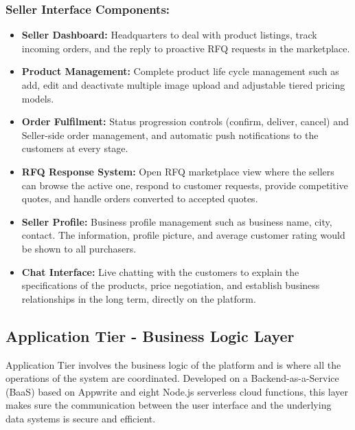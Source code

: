 \subsubsection{Seller Interface Components:}
\begin{itemize}
   \item \textbf{Seller Dashboard:} Headquarters to deal with product listings, track incoming orders, and the reply to proactive RFQ requests in the marketplace.
   \item \textbf{Product Management:} Complete product life cycle management such as add, edit and deactivate multiple image upload and adjustable tiered pricing models.
   \item \textbf{Order Fulfilment:} Status progression controls (confirm, deliver, cancel) and Seller-side order management, and automatic push notifications to the customers at every stage.
   \item \textbf{RFQ Response System:} Open RFQ marketplace view where the sellers can browse the active one, respond to customer requests, provide competitive quotes, and handle orders converted to accepted quotes.
   \item \textbf{Seller Profile:} Business profile management such as business name, city, contact. The information, profile picture, and average customer rating would be shown to all purchasers.
   \item \textbf{Chat Interface:} Live chatting with the customers to explain the specifications of the products, price negotiation, and establish business relationships in the long term, directly on the platform.
    
\end{itemize}

\subsection{Application Tier - Business Logic Layer}
Application Tier involves the business logic of the platform and is where all the operations of the system are coordinated. Developed on a Backend-as-a-Service (BaaS) based on Appwrite and eight Node.js serverless cloud functions, this layer makes sure the communication between the user interface and the underlying data systems is secure and efficient.

